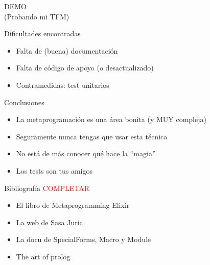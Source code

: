 \documentclass[14pt,aspectratio=169]{beamer}
\begin{document}
\begin{frame}
  \centering
  \huge
  DEMO\\
  \large
  (Probando mi TFM)
\end{frame}

\begin{frame}{Dificultades encontradas}
  \begin{itemize}
    \item Falta de (buena) documentación
    \item Falta de código de apoyo (o desactualizado)
    \item Contramedidas: test unitarios
  \end{itemize}
\end{frame}

\begin{frame}{Conclusiones}
  \begin{itemize}
    \item La metaprogramación es una área bonita (y MUY compleja)
    \item Seguramente nunca tengas que usar esta técnica
    \item No está de más conocer qué hace la ``magia''
    \item Los tests son tus amigos
  \end{itemize}
\end{frame}

\begin{frame}{Bibliografía}
  \textcolor{red}{COMPLETAR}
  \begin{itemize}
    \item El libro de Metaprogramming Elixir
    \item La web de Sasa Juric
    \item La docu de SpecialForms, Macro y Module
    \item The art of prolog
  \end{itemize}
\end{frame}
\end{document}
